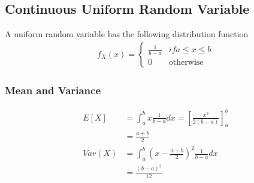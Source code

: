 \documentclass[../../probability-notes.tex]{subfiles}
\begin{document}
    \subsection{Continuous Uniform Random Variable}
    A uniform random variable has the following distribution function
    \begin{align*}
        f_{X}(x) = \begin{cases} \frac{1}{b-a} &\mbox{$if a \leq x \leq b$}\\
                                    0 &\mbox{otherwise} \end{cases}
    \end{align*}

    \subsubsection{Mean and Variance}
    \begin{align*}
        E[X] &= \int_{a}^{b} x \frac{1}{b-a} dx = [\frac{x^{2}}{2(b-a)}]_{a}^{b}\\
            &= \frac{a+b}{2}\\
        Var(X) &= \int_{a}^{b} (x - \frac{a+b}{2})^{2} \frac{1}{b-a} dx \\
            &= \frac{(b-a)^{2}}{12}
    \end{align*}
\end{document}
